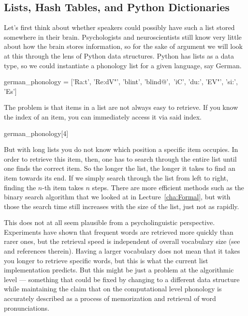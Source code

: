 \subsection{Lists, Hash Tables, and Python Dictionaries}

Let's first think about whether speakers could possibly have such a list stored somewhere in their brain.
Psychologists and neuroscientists still know very little about how the brain stores information, so for the sake of argument we will look at this through the lens of Python data structures.
Python has lists as a data type, so we could instantiate a phonology list for a given language, say German.
%
\begin{center}
    \begin{pythoncode}
        german_phonology = ['Ra:t', 'Re:dV"', 'blint', 'blind@',\
                            'iC', 'du:', 'EV"', 'si:', 'Es']
    \end{pythoncode}
\end{center}
%
The problem is that items in a list are not always easy to retrieve.
If you know the index of an item, you can immediately access it via said index.
%
\begin{center}
    \begin{pythoncode}
        german_phonology[4]
    \end{pythoncode}
\end{center}
%
But with long lists you do not know which position a specific item occupies.
In order to retrieve this item, then, one has to search through the entire list until one finds the correct item.
So the longer the list, the longer it takes to find an item towards its end.
If we simply search through the list from left to right, finding the $n$-th item takes $n$ steps.
There are more efficient methods such as the binary search algorithm that we looked at in Lecture~\ref{cha:Formal}, but with those the search time still increases with the size of the list, just not as rapidly.

This does not at all seem plausible from a psycholinguistic perspective.
Experiments have shown that frequent words are retrieved more quickly than rarer ones, but the retrieval speed is independent of overall vocabulary size (see \citealt{Jurafsky03} and references therein).
Having a larger vocabulary does not mean that it takes you longer to retrieve specific words, but this is what the current list implementation predicts.
But this might be just a problem at the algorithmic level --- something that could be fixed by changing to a different data structure while maintaining the claim that on the computational level phonology is accurately described as a process of memorization and retrieval of word pronunciations.

